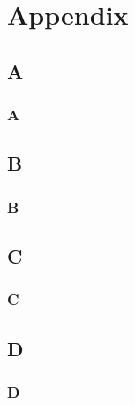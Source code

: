 \part{Appendix}
\appendix
\chapter{A}\label{app:reqgroup1}
\section{A}

\chapter{B}
\section{B}

\chapter{C}
\section{C}

\chapter{D}
\section{D}

